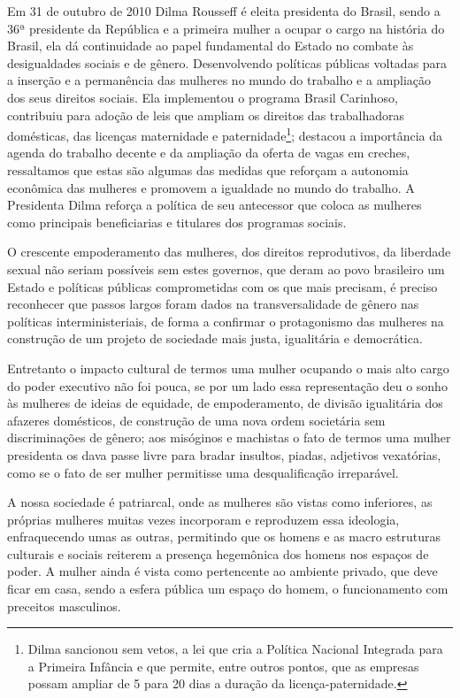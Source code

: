 Em 31 de outubro de 2010 Dilma Rousseff é eleita presidenta do Brasil,
sendo a 36ª presidente da República e a primeira mulher a ocupar o cargo
na história do Brasil, ela dá continuidade ao papel fundamental do
Estado no combate às desigualdades sociais e de gênero. Desenvolvendo
políticas públicas voltadas para a inserção e a permanência das mulheres
no mundo do trabalho e a ampliação dos seus direitos sociais. Ela
implementou o programa Brasil Carinhoso, contribuiu para adoção de leis
que ampliam os direitos das trabalhadoras domésticas, das licenças
maternidade e paternidade\footnote{Dilma sancionou sem vetos, a lei que
  cria a Política Nacional Integrada para a Primeira Infância e que
  permite, entre outros pontos, que as empresas possam ampliar de 5 para
  20 dias a duração da licença-paternidade.}; destacou a importância da
agenda do trabalho decente e da ampliação da oferta de vagas em creches,
ressaltamos que estas são algumas das medidas que reforçam a autonomia
econômica das mulheres e promovem a igualdade no mundo do trabalho. A
Presidenta Dilma reforça a política de seu antecessor que coloca as
mulheres como principais beneficiarias e titulares dos programas
sociais.

O crescente empoderamento das mulheres, dos direitos reprodutivos, da
liberdade sexual não seriam possíveis sem estes governos, que deram ao
povo brasileiro um Estado e políticas públicas comprometidas com os que
mais precisam, é preciso reconhecer que passos largos foram dados na
transversalidade de gênero nas políticas interministeriais, de forma a
confirmar o protagonismo das mulheres na construção de um projeto de
sociedade mais justa, igualitária e democrática.

Entretanto o impacto cultural de termos uma mulher ocupando o mais alto
cargo do poder executivo não foi pouca, se por um lado essa
representação deu o sonho às mulheres de ideias de equidade, de
empoderamento, de divisão igualitária dos afazeres domésticos, de
construção de uma nova ordem societária sem discriminações de gênero;
aos misóginos e machistas o fato de termos uma mulher presidenta os dava
passe livre para bradar insultos, piadas, adjetivos vexatórias, como se
o fato de ser mulher permitisse uma desqualificação irreparável.

A nossa sociedade é patriarcal, onde as mulheres são vistas como
inferiores, as próprias mulheres muitas vezes incorporam e reproduzem
essa ideologia, enfraquecendo umas as outras, permitindo que os homens e
as macro estruturas culturais e sociais reiterem a presença hegemônica
dos homens nos espaços de poder. A mulher ainda é vista como pertencente
ao ambiente privado, que deve ficar em casa, sendo a esfera pública um
espaço do homem, o funcionamento com preceitos masculinos.

